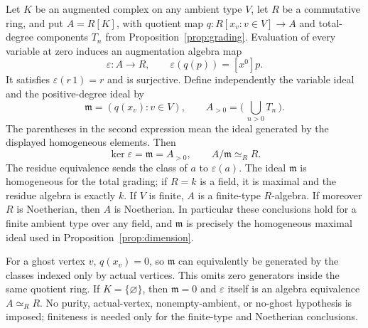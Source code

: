 \begin{proposition}\label{prop:augmentation}
\leanok
Let $K$ be an augmented complex on any ambient type $V$, let $R$ be a
commutative ring, and put $A=R[K]$, with quotient map
$q:R[x_v:v\in V]\to A$ and total-degree components $T_n$ from
Proposition~\ref{prop:grading}. Evaluation of every variable at zero induces
an augmentation algebra map
\[
 \varepsilon:A\longrightarrow R,\qquad
 \varepsilon(q(p))=[x^0]p.
\]
It satisfies $\varepsilon(r\,1)=r$ and is surjective. Define independently
the variable ideal and the positive-degree ideal by
\[
 \mathfrak m=(q(x_v):v\in V),\qquad
 A_{>0}=\bigl(\,\bigcup_{n>0}T_n\,\bigr).
\]
The parentheses in the second expression mean the ideal generated by the
displayed homogeneous elements. Then
\[
 \ker\varepsilon=\mathfrak m=A_{>0},\qquad
 A/\mathfrak m\simeq_R R.
\]
The residue equivalence sends the class of $a$ to $\varepsilon(a)$.
The ideal $\mathfrak m$ is homogeneous for the total grading; if $R=k$
is a field, it is maximal and the residue algebra is exactly $k$.
If $V$ is finite, $A$ is a finite-type $R$-algebra. If moreover $R$ is
Noetherian, then $A$ is Noetherian. In particular these conclusions hold
for a finite ambient type over any field, and $\mathfrak m$ is precisely
the homogeneous maximal ideal used in Proposition~\ref{prop:dimension}.

For a ghost vertex $v$, $q(x_v)=0$, so $\mathfrak m$ can equivalently be
generated by the classes indexed only by actual vertices. This omits zero
generators inside the same quotient ring. If $K=\{\varnothing\}$, then
$\mathfrak m=0$ and $\varepsilon$ itself is an algebra equivalence
$A\simeq_R R$. No purity, actual-vertex, nonempty-ambient, or no-ghost
hypothesis is imposed; finiteness is needed only for the finite-type and
Noetherian conclusions.
\end{proposition}
